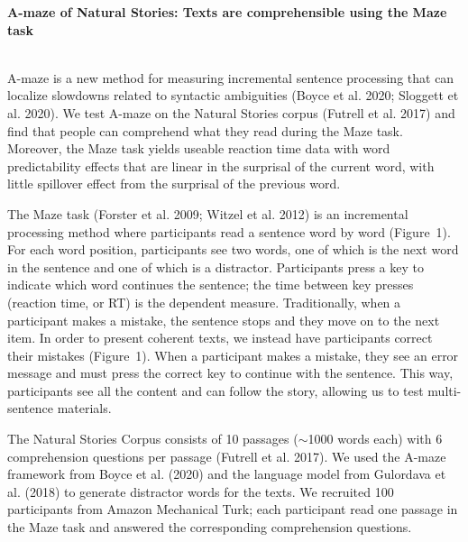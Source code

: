 \documentclass[11pt,a4paper]{article}
\renewcommand{\title}[1]{\textbf{#1}\\}
\newcommand{\authors}[1]{\iftoggle{anonymous}{\phantom{#1}}{#1}\\}
\newcommand{\email}[1]{\iftoggle{anonymous}{\phantom{#1}}{#1}}
\begin{document}


\title{A-maze of Natural Stories: Texts are comprehensible using the Maze task}
\authors{Veronica Boyce (MIT), Roger Levy (MIT)} %
\email{vboyce@mit.edu}
\newline
%

A-maze is a new method for measuring incremental sentence processing that can localize slowdowns related to syntactic ambiguities (Boyce et al. 2020; Sloggett et al. 2020). We test A-maze on the Natural Stories corpus (Futrell et al. 2017) and find that people can comprehend what they read during the Maze task. Moreover, the Maze task yields useable reaction time data with word predictability effects that are linear in the surprisal of the current word, with little spillover effect from the surprisal of the previous word. 

The Maze task (Forster et al. 2009; Witzel et al. 2012) is an incremental processing method where participants read a sentence word by word  (Figure~1). For each word position, participants see two words, one of which is the next word in the sentence and one of which is a distractor. Participants press a key to indicate which word continues the sentence; the time between key presses (reaction time, or RT) is the dependent measure.  Traditionally, when a participant makes a mistake, the sentence stops and they move on to the next item. In order to present coherent texts, we instead have participants correct their mistakes (Figure~1). When a participant makes a mistake, they see an error message and must press the correct key to continue with the sentence. This way, participants see all the content and can follow the story, allowing us to test multi-sentence materials.

The Natural Stories Corpus consists of 10 passages ($\sim$1000 words each) with 6 comprehension questions per passage (Futrell et al. 2017). We used the A-maze framework from Boyce et al. (2020) and the language model from Gulordava et al. (2018) to generate distractor words for the texts. We recruited 100 participants from Amazon Mechanical Turk; each participant read one passage in the Maze task and answered the corresponding comprehension questions. 
\end{document}
